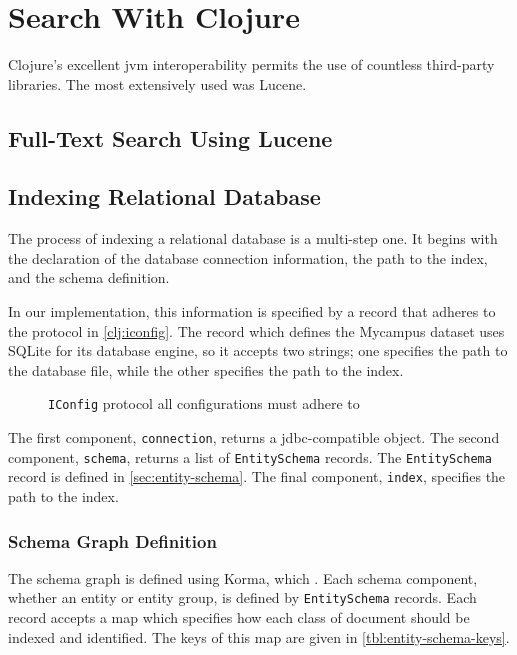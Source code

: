 \section{Search With Clojure}
	Clojure's excellent \gls{jvm} interoperability permits the use of countless third-party libraries.  The most extensively used was Lucene.
	
	\subsection{Full-Text Search Using Lucene}
	
	\subsection{Indexing Relational Database}
		The process of indexing a relational database is a multi-step one.  It begins with the declaration of the database connection information, the path to the index, and the schema definition.
		
		In our implementation, this information is specified by a record that adheres to the protocol in \vref{clj:iconfig}.  The record which defines the Mycampus dataset uses SQLite for its database engine, so it accepts two strings; one specifies the path to the database file, while the other specifies the path to the index.
		
		\begin{figure}
			\begin{singlespaced}
			\end{singlespaced}
			
			\caption{\texttt{IConfig} protocol all configurations must adhere to}
			\label{clj:iconfig}
		\end{figure}
		
		The first component, \texttt{connection}, returns a \gls{jdbc}-compatible object.  The second component, \texttt{schema}, returns a list of \texttt{EntitySchema} records.  The \texttt{EntitySchema} record is defined in \vref{sec:entity-schema}.  The final component, \texttt{index}, specifies the path to the index.
		
		\subsubsection{Schema Graph Definition}
		\label{sec:entity-schema}
			The schema graph is defined using Korma, which .  Each schema component, whether an entity or entity group, is defined by \texttt{EntitySchema} records.  Each record accepts a map which specifies how each class of document should be indexed and identified.  The keys of this map are given in \vref{tbl:entity-schema-keys}.
			
